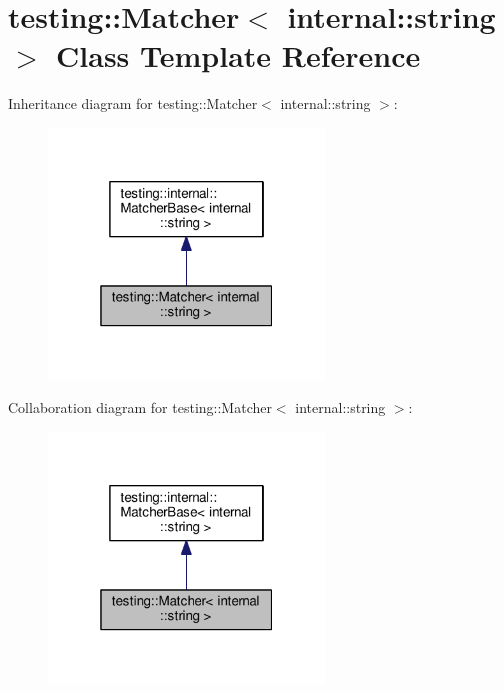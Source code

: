 \hypertarget{classtesting_1_1Matcher_3_01internal_1_1string_01_4}{}\section{testing\+:\+:Matcher$<$ internal\+:\+:string $>$ Class Template Reference}
\label{classtesting_1_1Matcher_3_01internal_1_1string_01_4}


Inheritance diagram for testing\+:\+:Matcher$<$ internal\+:\+:string $>$\+:\nopagebreak
\begin{figure}[H]
\begin{center}
\leavevmode
\includegraphics[width=208pt]{classtesting_1_1Matcher_3_01internal_1_1string_01_4__inherit__graph}
\end{center}
\end{figure}


Collaboration diagram for testing\+:\+:Matcher$<$ internal\+:\+:string $>$\+:\nopagebreak
\begin{figure}[H]
\begin{center}
\leavevmode
\includegraphics[width=208pt]{classtesting_1_1Matcher_3_01internal_1_1string_01_4__coll__graph}
\end{center}
\end{figure}
